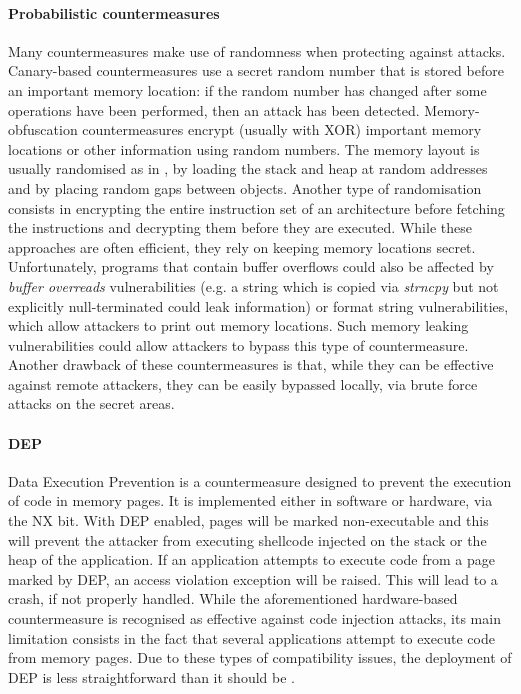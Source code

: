 \paragraph{Probabilistic countermeasures}
Many countermeasures make use of randomness when protecting against attacks. Canary-based countermeasures \cite{Krennmair:2003:CLE,Robertson:2003:RTD} 
use a secret random number that is stored before an important memory location: if the random number has changed after some operations have been performed, then an attack has been detected. Memory-obfuscation countermeasures \cite{Bhatkar:2008:DSR,Cowan:2003:PPP} encrypt (usually with XOR) important memory locations or other information using random numbers.  The memory layout is usually randomised as in \cite{Bhatkar:2003:AOE,Bhatkar:2005:ETC,Xu:2003:TRR}, 
by loading the stack and heap at random addresses and by placing random gaps between objects. 
Another type of randomisation consists in encrypting the entire instruction set of an architecture \cite{Barrantes:2003:RIS}
before fetching the instructions and decrypting them before they are executed. While these approaches are often efficient, they rely on keeping memory locations secret. Unfortunately, programs that contain buffer overflows could also be affected by  \emph{buffer overreads} vulnerabilities (e.g. a string which is copied via \emph{strncpy} but not explicitly null-terminated could leak information) or format string vulnerabilities, which allow attackers to print out memory locations. Such memory leaking vulnerabilities could allow attackers to bypass this type of countermeasure. Another drawback of these countermeasures is that, while they can be effective against remote attackers, they can be easily bypassed locally, via brute force attacks on the secret areas.
 
\paragraph{DEP}
Data Execution Prevention \cite{dep} is a countermeasure designed to prevent the execution of code in memory pages. It is implemented  either in software or hardware, via the NX bit. With DEP enabled, pages will be marked non-executable and this will prevent the attacker from executing shellcode injected on the stack or the heap of the application. If an application attempts to execute code from a page marked by DEP, an access violation exception will be raised. This will lead to a crash, if not properly handled. While the aforementioned hardware-based countermeasure is recognised as effective against code injection attacks, its main limitation consists in the fact that several applications attempt to execute code from memory pages. 
Due to these types of compatibility issues, the deployment of DEP is less straightforward than it should be \cite{depdef}.

